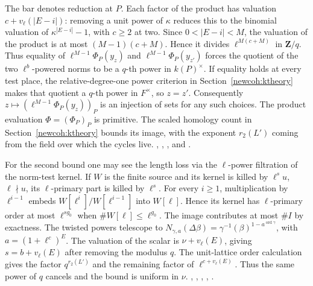 The bar denotes reduction at \(P\). Each factor of the product has
valuation \(c+v_\ell(|E-i|)\): removing a unit power of \(\kappa\)
reduces this to the binomial valuation of \(\kappa^{|E-i|}-1\),
with \(c\ge2\) at two. Since \(0<|E-i|<M\), the valuation of the
product is at most \((M-1)(c+M)\). Hence it divides
\(\ell^{M(c+M)}\) in \(\mathbf Z/q\).
Thus equality of \(\ell^{M-1}\Phi_P(y_z)\) and
\(\ell^{M-1}\Phi_P(y_{z'})\) forces the quotient of the two
\(\ell^b\)-powered norms to be a \(q\)-th power in \(k(P)^\times\).
If equality holds at every test place, the relative-degree-one power
criterion in Section~\ref{newcoh:ktheory} makes that quotient a
\(q\)-th power in \(F^\times\), so \(z=z'\).
Consequently \(z\mapsto(\ell^{M-1}\Phi_P(y_z))_P\) is an injection
of sets for any such choices. The product evaluation \(\Phi=(\Phi_P)_P\)
is primitive. The scaled homology count in Section~\ref{newcoh:ktheory}
bounds its image, with the exponent \(r_2(L')\) coming from the field
over which the cycles live.
,
,
, and
.

For the second bound one may see the length loss via the \(\ell\)-power filtration of the norm-test kernel. If \(W\) is the finite source and its kernel is killed by \(\ell^s u\), \(\ell\nmid u\), its \(\ell\)-primary part is killed by \(\ell^s\). For every \(i\ge1\), multiplication by \(\ell^{i-1}\) embeds \(W[\ell^i]/W[\ell^{i-1}]\) into \(W[\ell]\). Hence its kernel has \(\ell\)-primary order at most \(\ell^{s g_0}\) when \(\#W[\ell]\le\ell^{g_0}\). The image contributes at most \(\#I\) by exactness. The twisted powers telescope to \(N_{\gamma,a}(\Delta\beta)=\gamma^{-1}(\beta)^{1-a^{\operatorname{ord}\gamma}}\), with \(a=(1+\ell^c)^E\). The valuation of the scalar is \(\nu+v_\ell(E)\), giving \(s=b+v_\ell(E)\) after removing the modulus \(q\). The unit-lattice order calculation gives the factor \(q^{r_2(L')}\) and the remaining factor of \(\ell^{c+v_\ell(E)}\). Thus the same power of \(q\) cancels and the bound is uniform in \(\nu\).
,
,
,
,
.

